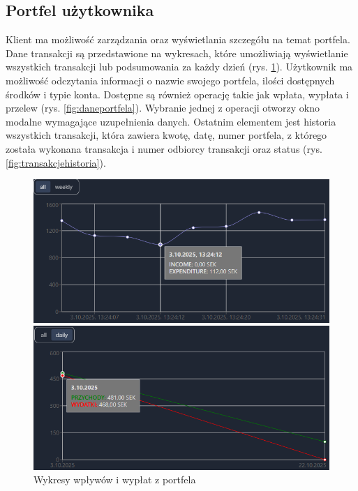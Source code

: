 \subsection*{Portfel użytkownika}
Klient ma możliwość zarządzania oraz wyświetlania szczegółu na temat portfela. Dane transakcji są przedstawione na wykresach, które umożliwiają wyświetlanie wszystkich transakcji lub podsumowania za każdy dzień (rys. \ref{fig:wykresy}). Użytkownik ma możliwość odczytania informacji o nazwie swojego portfela, ilości dostępnych środków i typie konta. Dostępne są również operację takie jak wpłata, wypłata i przelew (rys. \ref{fig:daneportfela}). Wybranie jednej z operacji otworzy okno modalne wymagające uzupełnienia danych. Ostatnim elementem jest historia wszystkich transakcji, która zawiera kwotę, datę, numer portfela, z którego została wykonana transakcja i numer odbiorcy transakcji oraz status (rys. \ref{fig:transakcjehistoria}). 
\begin{figure}[H]
	\begin{minipage}{0.5\textwidth}
	\centering
	\includegraphics[width=\linewidth]{images/TransakcjeAll}
\end{minipage}
\hfill
\begin{minipage}{0.5\textwidth}
	\centering
	\includegraphics[width=\linewidth]{images/TransakcjeDaily}
\end{minipage}
	\caption{Wykresy wpływów i wypłat z portfela}
	\label{fig:wykresy}
\end{figure}

